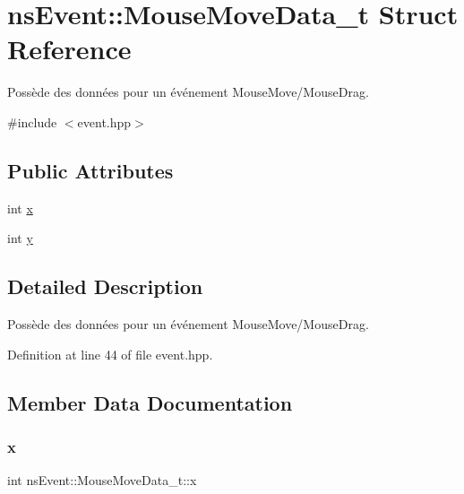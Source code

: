 \hypertarget{structns_event_1_1_mouse_move_data__t}{}\section{ns\+Event\+:\+:Mouse\+Move\+Data\+\_\+t Struct Reference}
\label{structns_event_1_1_mouse_move_data__t}


Possède des données pour un événement Mouse\+Move/\+Mouse\+Drag.  




{\ttfamily \#include $<$event.\+hpp$>$}

\subsection*{Public Attributes}
\begin{DoxyCompactItemize}
\item 
int \hyperlink{structns_event_1_1_mouse_move_data__t_a5093f057977a7d290ead30266c6599fb}{x}
\item 
int \hyperlink{structns_event_1_1_mouse_move_data__t_a9e72b2e9f3c2f68cc33391d076f2c446}{y}
\end{DoxyCompactItemize}


\subsection{Detailed Description}
Possède des données pour un événement Mouse\+Move/\+Mouse\+Drag. 

Definition at line 44 of file event.\+hpp.



\subsection{Member Data Documentation}
\mbox{\label{structns_event_1_1_mouse_move_data__t_a5093f057977a7d290ead30266c6599fb}} 
\subsubsection{\texorpdfstring{x}{x}}
{\footnotesize\ttfamily int ns\+Event\+::\+Mouse\+Move\+Data\+\_\+t\+::x}

